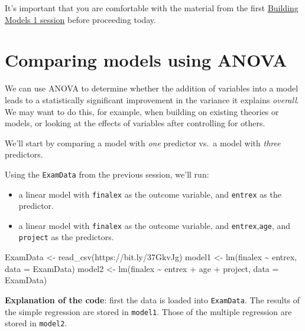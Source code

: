 \documentclass[
]{book}
\newenvironment{Shaded}{\begin{snugshade}}{\end{snugshade}}
\newcommand{\AttributeTok}[1]{\textcolor[rgb]{0.77,0.63,0.00}{#1}}
\newcommand{\FunctionTok}[1]{\textcolor[rgb]{0.00,0.00,0.00}{#1}}
\newcommand{\NormalTok}[1]{#1}
\newcommand{\OtherTok}[1]{\textcolor[rgb]{0.56,0.35,0.01}{#1}}
\newcommand{\SpecialCharTok}[1]{\textcolor[rgb]{0.00,0.00,0.00}{#1}}
\newcommand{\StringTok}[1]{\textcolor[rgb]{0.31,0.60,0.02}{#1}}
\theoremstyle{definition}
\theoremstyle{definition}
\theoremstyle{definition}
\theoremstyle{definition}
\theoremstyle{remark}
\begin{document}
It's important that you are comfortable with the material from the first \href{building-models-1.html}{Building Models 1 session} before proceeding today.

\hypertarget{comparing-models-using-anova}{%
\section{Comparing models using ANOVA}\label{comparing-models-using-anova}}

We can use ANOVA to determine whether the addition of variables into a model leads to a statistically significant improvement in the variance it explains \emph{overall}. We may want to do this, for example, when building on existing theories or models, or looking at the effects of variables after controlling for others.

\hfill\break
We'll start by comparing a model with \emph{one} predictor vs.~a model with \emph{three} predictors.

\hfill\break
Using the \texttt{ExamData} from the previous session, we'll run:

\begin{itemize}
\item
  a linear model with \texttt{finalex} as the outcome variable, and \texttt{entrex} as the predictor.
\item
  a linear model with \texttt{finalex} as the outcome variable, and \texttt{entrex},\texttt{age}, and \texttt{project} as the predictors.
\end{itemize}

\begin{Shaded}
\begin{Highlighting}[]
\NormalTok{ExamData }\OtherTok{\textless{}{-}} \FunctionTok{read\_csv}\NormalTok{(}\StringTok{\textquotesingle{}https://bit.ly/37GkvJg\textquotesingle{}}\NormalTok{)              }
\NormalTok{model1   }\OtherTok{\textless{}{-}} \FunctionTok{lm}\NormalTok{(finalex }\SpecialCharTok{\textasciitilde{}}\NormalTok{ entrex, }\AttributeTok{data =}\NormalTok{ ExamData)           }
\NormalTok{model2   }\OtherTok{\textless{}{-}} \FunctionTok{lm}\NormalTok{(finalex }\SpecialCharTok{\textasciitilde{}}\NormalTok{ entrex }\SpecialCharTok{+}\NormalTok{ age }\SpecialCharTok{+}\NormalTok{ project, }\AttributeTok{data =}\NormalTok{ ExamData) }
\end{Highlighting}
\end{Shaded}

\hfill\break
\textbf{Explanation of the code}: first the data is loaded into \texttt{ExamData}. The results of the simple regression are stored in \texttt{model1}. Those of the multiple regression are stored in \texttt{model2}.
\end{document}
